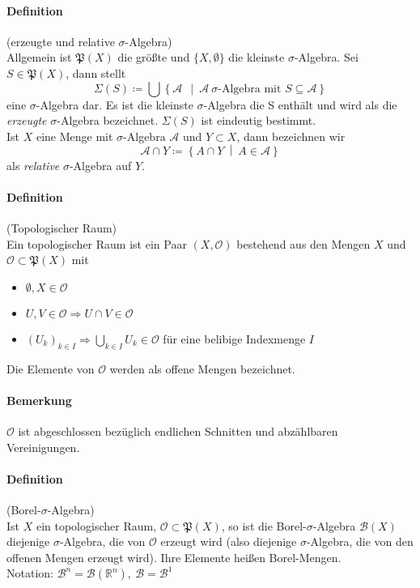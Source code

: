 \documentclass[12pt,a4paper,fleqn]{article}
\def\set#1{{\left\{ #1 \right\}}}
\def\Mid{\ \middle|\ }
\begin{document}
\paragraph{Definition}(erzeugte und relative $\sigma$-Algebra)\\
Allgemein ist $\mathfrak{P}(X)$ die größte und $\{X, \emptyset\}$ die kleinste $\sigma$-Algebra. Sei $S \in \mathfrak{P}(X)$, dann stellt
\begin{displaymath}
\Sigma(S) \coloneqq \bigcup \set{\mathcal{A}\ \Mid \mathcal{A}\ \sigma\text{-Algebra mit }S \subseteq \mathcal{A}}
\end{displaymath}
eine $\sigma$-Algebra dar. Es ist die kleinste $\sigma$-Algebra die S enthält und wird als die \textit{erzeugte} $\sigma$-Algebra bezeichnet. $\Sigma(S)$ ist eindeutig bestimmt.\\
Ist $X$ eine Menge mit $\sigma$-Algebra $\mathcal{A}$ und $Y \subset X$, dann bezeichnen wir 
\begin{displaymath}
\mathcal{A} \cap Y \coloneqq \set{A \cap Y \Mid A \in \mathcal{A}}
\end{displaymath}
als \textit{relative} $\sigma$-Algebra auf $Y$.

\paragraph{Definition}(Topologischer Raum)\\
Ein topologischer Raum ist ein Paar $(X, \mathcal{O})$ bestehend aus den Mengen $X$ und $\mathcal{O} \subset \mathfrak{P}(X)$ mit
\begin{itemize}
\item $\emptyset, X \in \mathcal{O}$
\item $U, V \in \mathcal{O} \Rightarrow U \cap V \in \mathcal{O}$
\item $(U_k)_{k \in I} \Rightarrow \bigcup_{k \in I} U_k \in \mathcal{O}$
für eine belibige Indexmenge $I$
\end{itemize} 
Die Elemente von $\mathcal{O}$ werden als offene Mengen bezeichnet.

\paragraph{Bemerkung} $\mathcal{O}$ ist abgeschlossen bezüglich endlichen Schnitten und abzählbaren Vereinigungen.

\paragraph{Definition}(Borel-$\sigma$-Algebra)\\
Ist $X$ ein topologischer Raum, $\mathcal{O} \subset \mathfrak{P}(X)$, so ist die Borel-$\sigma$-Algebra $\mathcal{B}(X)$ diejenige $\sigma$-Algebra, die von $\mathcal{O}$ erzeugt wird (also diejenige $\sigma$-Algebra, die von den offenen Mengen erzeugt wird). Ihre Elemente heißen Borel-Mengen.\\
Notation:
$\mathcal{B}^n=\mathcal{B}(\mathbb{R}^n),\ \mathcal{B}=\mathcal{B}^1$
\end{document}

